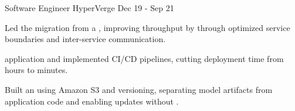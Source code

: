 \begin{cventries}
  \cventry
    {Software Engineer}
    {HyperVerge}
    {Dec 19 - Sep 21}
    {}
    {
      \begin{cvitems}
        \item {Led the migration from a , improving throughput by  through optimized service boundaries and inter-service communication.}
        \item { application and implemented CI/CD pipelines, cutting deployment time from hours to minutes.}
        \item {Built an  using Amazon S3 and versioning,
          separating model artifacts from application code and enabling updates without .}
      \end{cvitems}
    }

\end{cventries}
